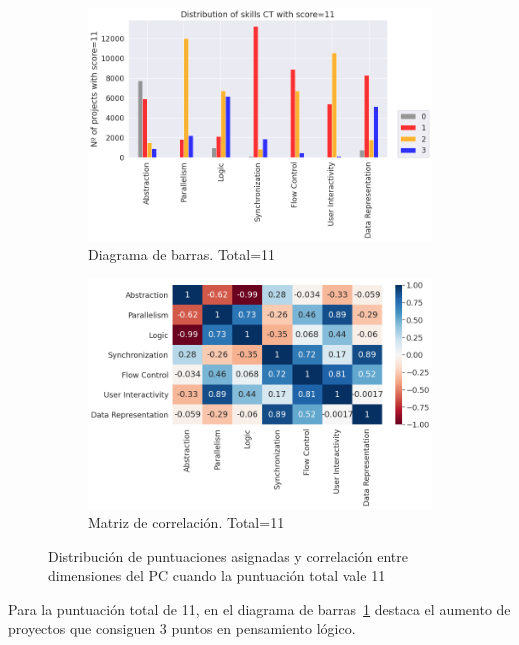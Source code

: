 \documentclass[a4paper, 12pt]{book}
\begin{document}
\begin{figure}[H]
    \centering
    \begin{subfigure}[h]{.49\textwidth} 
        \includegraphics[width=\textwidth]{img/distribucion_11_Scratch}
        \caption{Diagrama de barras. Total=11}
        \label{fig:total11}
    \end{subfigure}       
    \begin{subfigure}[h]{.49\textwidth} 
        \includegraphics[width=\textwidth]{img/corr_11_Scratch}
        \caption{Matriz de correlación. Total=11}
        \label{fig:corr11}
    \end{subfigure}
     \caption{Distribución de puntuaciones asignadas y correlación entre dimensiones del PC cuando la puntuación total vale 11}
\end{figure}

Para la puntuación total de 11, en el diagrama de barras~\ref{fig:total11} destaca el aumento de proyectos que consiguen 3 puntos en pensamiento lógico.
\end{document}
